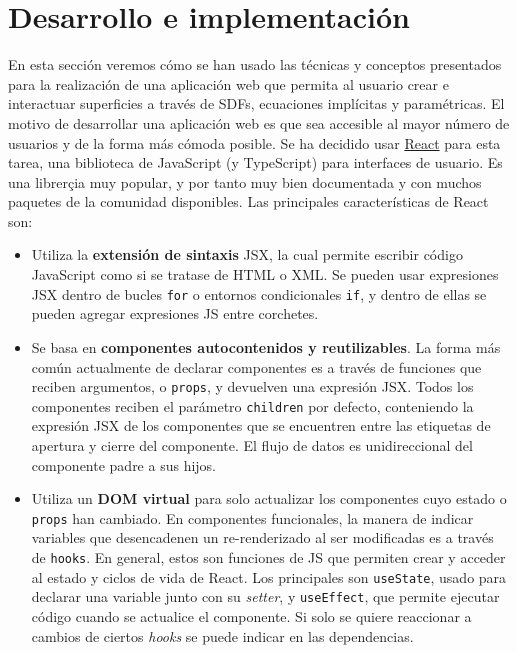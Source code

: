 
\chapter{Desarrollo e implementación}
En esta sección veremos cómo se han usado las técnicas y conceptos presentados para la realización de una aplicación web que permita al usuario crear e interactuar superficies a través de SDFs, ecuaciones implícitas y paramétricas. El motivo de desarrollar una aplicación web es que sea accesible al mayor número de usuarios y de la forma más cómoda posible. Se ha decidido usar \href{https://es.reactjs.org/}{React} para esta tarea, una biblioteca de JavaScript (y TypeScript) para interfaces de usuario. Es una librerçia muy popular, y por tanto muy bien documentada y con muchos paquetes de la comunidad disponibles. Las principales características de React son:
\begin{itemize}
    \item Utiliza la \textbf{extensión de sintaxis} JSX, la cual permite escribir código JavaScript como si se tratase de HTML o XML. Se pueden usar expresiones JSX dentro de bucles \texttt{for} o entornos condicionales \texttt{if}, y dentro de ellas se pueden agregar expresiones JS entre corchetes. 
    \item Se basa en \textbf{componentes autocontenidos y reutilizables}. La forma más común actualmente de declarar componentes es a través de funciones que reciben argumentos, o \texttt{props}, y devuelven una expresión JSX. Todos los componentes reciben el parámetro \texttt{children} por defecto, conteniendo la expresión JSX de los componentes que se encuentren entre las etiquetas de apertura y cierre del componente. El flujo de datos es unidireccional del componente padre a sus hijos.
    \item Utiliza un \textbf{DOM virtual} para solo actualizar los componentes cuyo estado o \texttt{props} han cambiado. En componentes funcionales, la manera de indicar variables que desencadenen un re-renderizado al ser modificadas es a través de \texttt{hooks}. En general, estos son funciones de JS que permiten crear y acceder al estado y ciclos de vida de React. Los principales son \texttt{useState}, usado para declarar una variable junto con su \textit{setter}, y \texttt{useEffect}, que permite ejecutar código cuando se actualice el componente. Si solo se quiere reaccionar a cambios de ciertos \textit{hooks} se puede indicar en las dependencias.
\end{itemize}

